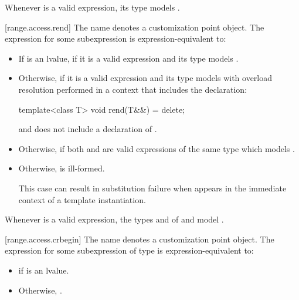 \pnum
\begin{note}
Whenever  is a valid expression, its type models
.
\end{note}

[range.access.rend]{}
\pnum
The name  denotes a customization point
object. The expression
 for some subexpression  is
expression-equivalent to:

\begin{itemize}
\item
  If  is an lvalue, 
  if it is a valid expression and its type  models
  .

\item
  Otherwise,  if it is a valid
  expression and its type  models
   with overload
  resolution performed in a context that includes the declaration:
  \begin{codeblock}
  template<class T> void rend(T&&) = delete;
  \end{codeblock}

  and does not include a declaration of .

\item
  Otherwise,  if both
   and  are valid
  expressions of the same type  which models
  .

\item
  Otherwise,  is ill-formed.
  \begin{note}
  This case can result in substitution failure when 
  appears in the immediate context of a template instantiation.
  \end{note}
\end{itemize}

\pnum
\begin{note}
Whenever  is a valid expression,
the types  and  of
 and 
model .
\end{note}

[range.access.crbegin]{}
\pnum
The name  denotes a customization point
object. The expression
 for some subexpression  of type
 is expression-equivalent to:
\begin{itemize}
\item {} if  is
  an lvalue.
\item Otherwise, .
\end{itemize}

